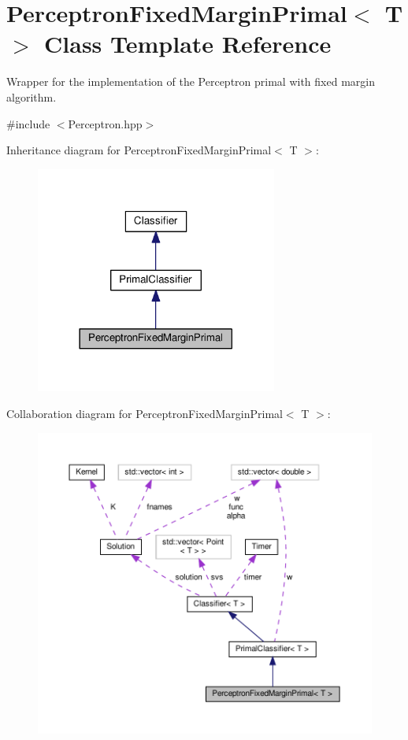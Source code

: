 \hypertarget{class_perceptron_fixed_margin_primal}{}\section{Perceptron\+Fixed\+Margin\+Primal$<$ T $>$ Class Template Reference}
\label{class_perceptron_fixed_margin_primal}


Wrapper for the implementation of the Perceptron primal with fixed margin algorithm.  




{\ttfamily \#include $<$Perceptron.\+hpp$>$}



Inheritance diagram for Perceptron\+Fixed\+Margin\+Primal$<$ T $>$\+:\nopagebreak
\begin{figure}[H]
\begin{center}
\leavevmode
\includegraphics[width=225pt]{class_perceptron_fixed_margin_primal__inherit__graph}
\end{center}
\end{figure}


Collaboration diagram for Perceptron\+Fixed\+Margin\+Primal$<$ T $>$\+:
\nopagebreak
\begin{figure}[H]
\begin{center}
\leavevmode
\includegraphics[width=350pt]{class_perceptron_fixed_margin_primal__coll__graph}
\end{center}
\end{figure}
